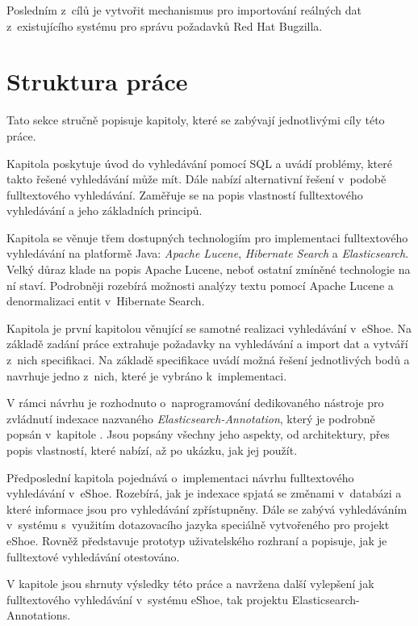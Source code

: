 \documentclass[11pt,oneside]{fithesis2}
\begin{document}
Posledním z~cílů je vytvořit mechanismus pro importování reálných dat z~existujícího systému pro správu požadavků Red Hat Bugzilla.

\section{Struktura práce}
Tato sekce stručně popisuje kapitoly, které se zabývají jednotlivými cíly této práce.

Kapitola \textit{} poskytuje úvod do vyhledávání pomocí SQL a uvádí problémy, které takto řešené vyhledávání může mít. Dále nabízí alternativní řešení v~podobě fulltextového vyhledávání. Zaměřuje se na popis vlastností fulltextového vyhledávání a jeho základních principů.

Kapitola \textit{} se věnuje třem dostupných technologiím pro implementaci fulltextového vyhledávání na platformě Java: \emph{Apache Lucene}, \emph{Hibernate Search} a \emph{Elasticsearch}. Velký důraz klade na popis Apache Lucene, neboť ostatní zmíněné technologie na ní staví. Podrobněji rozebírá možnosti analýzy textu pomocí Apache Lucene a denormalizaci entit v~Hibernate Search.

Kapitola \textit{} je první kapitolou věnující se samotné realizaci vyhledávání v~eShoe. Na základě zadání práce extrahuje požadavky na vyhledávání a import dat a vytváří z~nich specifikaci. Na základě specifikace uvádí možná řešení jednotlivých bodů a navrhuje jedno z~nich, které je vybráno k~implementaci.

V rámci návrhu je rozhodnuto o~naprogramování dedikovaného nástroje pro zvládnutí indexace nazvaného \emph{Elasticsearch-Annotation}, který je podrobně popsán v~kapitole \textit{}. Jsou popsány všechny jeho aspekty, od architektury, přes popis vlastností, které nabízí, až po ukázku, jak jej použít.

Předposlední kapitola \textit{} pojednává o~implementaci návrhu fulltextového vyhledávání v~eShoe. Rozebírá, jak je indexace spjatá se změnami v~databázi a které informace jsou pro vyhledávání zpřístupněny. Dále se zabývá vyhledáváním v~systému s~využitím dotazovacího jazyka speciálně vytvořeného pro projekt eShoe. Rovněž představuje prototyp uživatelského rozhraní a popisuje, jak je fulltextové vyhledávání otestováno.

V kapitole \textit{} jsou shrnuty výsledky této práce a navržena další vylepšení jak fulltextového vyhledávání v~systému eShoe, tak projektu Elasticsearch-Annotations.
\end{document}
